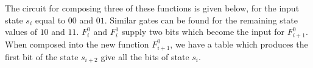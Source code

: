 
The circuit for composing three of these functions is given below, for
the input state $s_i$ equal to $00$ and $01$. Similar gates can be found
for the remaining state values of $10$ and $11$.
$F_i^0$ and $F_i^1$ supply two bits which become the input for
$F_{i+1}^0$. When composed into the new function $F_{i+1}^0$,
we have a table which produces the first bit of the state $s_{i+2}$
give all the bits of state $s_{i}$.


